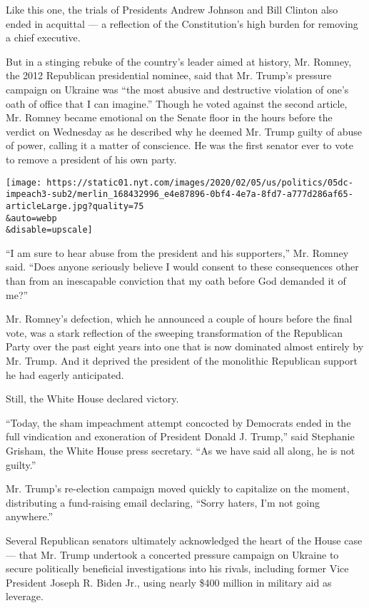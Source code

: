 Like this one, the trials of Presidents Andrew Johnson and Bill Clinton
also ended in acquittal --- a reflection of the Constitution's high
burden for removing a chief executive.

But in a stinging rebuke of the country's leader aimed at history, Mr.
Romney, the 2012 Republican presidential nominee, said that Mr. Trump's
pressure campaign on Ukraine was ``the most abusive and destructive
violation of one's oath of office that I can imagine.'' Though he voted
against the second article, Mr. Romney became emotional on the Senate
floor in the hours before the verdict on Wednesday as he described why
he deemed Mr. Trump guilty of abuse of power, calling it a matter of
conscience. He was the first senator ever to vote to remove a president
of his own party.

\texttt{[image: https://static01.nyt.com/images/2020/02/05/us/politics/05dc-impeach3-sub2/merlin\_168432996\_e4e87896-0bf4-4e7a-8fd7-a777d286af65-articleLarge.jpg?quality=75\\\&auto=webp\\\&disable=upscale]}

``I am sure to hear abuse from the president and his supporters,'' Mr.
Romney said. ``Does anyone seriously believe I would consent to these
consequences other than from an inescapable conviction that my oath
before God demanded it of me?''

Mr. Romney's defection, which he announced a couple of hours before the
final vote, was a stark reflection of the sweeping transformation of the
Republican Party over the past eight years into one that is now
dominated almost entirely by Mr. Trump. And it deprived the president of
the monolithic Republican support he had eagerly anticipated.

Still, the White House declared victory.

``Today, the sham impeachment attempt concocted by Democrats ended in
the full vindication and exoneration of President Donald J. Trump,''
said Stephanie Grisham, the White House press secretary. ``As we have
said all along, he is not guilty.''

Mr. Trump's re-election campaign moved quickly to capitalize on the
moment, distributing a fund-raising email declaring, ``Sorry haters, I'm
not going anywhere.''

Several Republican senators ultimately acknowledged the heart of the
House case --- that Mr. Trump undertook a concerted pressure campaign on
Ukraine to secure politically beneficial investigations into his rivals,
including former Vice President Joseph R. Biden Jr., using nearly \$400
million in military aid as leverage.

